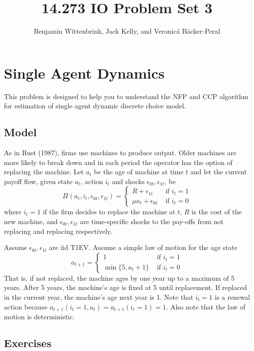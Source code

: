 \documentclass{article}
\title{14.273 IO Problem Set 3}
\author{Benjamin Wittenbrink, Jack Kelly, and Veronicá Bäcker-Peral}
\begin{document}
\maketitle

\section{Single Agent Dynamics}

This problem is designed to help you to understand the NFP and CCP algorithm for estimation of single agent dynamic discrete choice model.

\subsection{Model}

As in Rust (1987), firms use machines to produce output. Older machines are more likely to break down and in each period the operator has the option of replacing the machine. Let $a_t$ be the age of machine at time $t$ and let the current payoff flow, given state $a_t$, action $i_t$ and shocks $\epsilon_{0t}, \epsilon_{1t}$, be 
\[
\Pi(a_t, i_t, \epsilon_{0t}, \epsilon_{1t}) = \begin{cases}
    R + \epsilon_{1t} & \text{ if $i_t = 1$} \\ 
    \mu a_t + \epsilon_{0t} & \text{ if $i_t = 0$} 
\end{cases}
\]
where $i_t = 1$ if the firm decides to replace the machine at $t$, $R$ is the cost of the new machine, and $\epsilon_{0t}, \epsilon_{1t}$ are time-specific shocks to the pay-offs from not
replacing and replacing respectively.

Assume $\epsilon_{0t}, \epsilon_{1t}$ are iid T1EV. Assume a simple law of motion for the
age state 
\[
a_{t+1} = \begin{cases}
    1 & \text{ if $i_t = 1$} \\ 
    \min\{5, a_t + 1\} & \text{ if $i_t = 0$} 
\end{cases}
\]
That is, if not replaced, the machine ages by one year up to a maximum of 5 years. After 5 years, the machine’s age is fixed at 5 until replacement. If replaced in the current year, the machine’s age next year is 1. Note that $i_t = 1$ is a renewal action because $a_{t+1}(i_t = 1, a_t) = a_{t+1}(i_t = 1) = 1$. Also note that
the law of motion is deterministic.


\subsection{Exercises}
\end{document}
